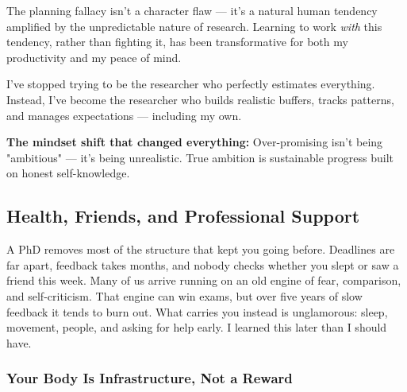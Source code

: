 \documentclass[11pt,a4paper]{article}
\begin{document}
\begin{tcolorbox}[colback=purple!5,colframe=purple!40,title={My Personal Realization}]
The planning fallacy isn't a character flaw — it's a natural human tendency amplified by the unpredictable nature of research. Learning to work \textit{with} this tendency, rather than fighting it, has been transformative for both my productivity and my peace of mind.

I've stopped trying to be the researcher who perfectly estimates everything. Instead, I've become the researcher who builds realistic buffers, tracks patterns, and manages expectations — including my own.

\textbf{The mindset shift that changed everything:} Over-promising isn't being "ambitious" — it's being unrealistic. True ambition is sustainable progress built on honest self-knowledge.
\end{tcolorbox}

\subsection{Health, Friends, and Professional Support}\label{sec:health}

\begin{tcolorbox}[colback=blue!5,colframe=darkblue,title={Why This Gets Its Own Section}]
A PhD removes most of the structure that kept you going before. Deadlines are far apart, feedback takes months, and nobody checks whether you slept or saw a friend this week. Many of us arrive running on an old engine of fear, comparison, and self-criticism. That engine can win exams, but over five years of slow feedback it tends to burn out. What carries you instead is unglamorous: sleep, movement, people, and asking for help early. I learned this later than I should have.
\end{tcolorbox}

\subsubsection{Your Body Is Infrastructure, Not a Reward}
\end{document}
